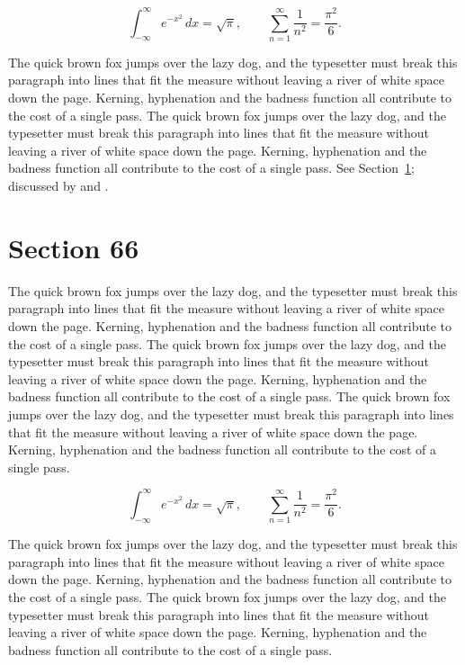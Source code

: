 \documentclass{article}
\begin{document}
\begin{equation}\label{eq:65}
\int_{-\infty}^{\infty} e^{-x^{2}}\,dx = \sqrt{\pi}, \qquad
\sum_{n=1}^{\infty} \frac{1}{n^{2}} = \frac{\pi^{2}}{6}.
\end{equation}

The quick brown fox jumps over the lazy dog, and the typesetter must break this paragraph into lines that fit the measure without leaving a river of white space down the page. Kerning, hyphenation and the badness function all contribute to the cost of a single pass. The quick brown fox jumps over the lazy dog, and the typesetter must break this paragraph into lines that fit the measure without leaving a river of white space down the page. Kerning, hyphenation and the badness function all contribute to the cost of a single pass. 
See Section~\ref{sec:66}; discussed by \textcite{k1} and \textcite{l3}.
\section{Section 66}
\label{sec:66}
The quick brown fox jumps over the lazy dog, and the typesetter must break this paragraph into lines that fit the measure without leaving a river of white space down the page. Kerning, hyphenation and the badness function all contribute to the cost of a single pass. The quick brown fox jumps over the lazy dog, and the typesetter must break this paragraph into lines that fit the measure without leaving a river of white space down the page. Kerning, hyphenation and the badness function all contribute to the cost of a single pass. The quick brown fox jumps over the lazy dog, and the typesetter must break this paragraph into lines that fit the measure without leaving a river of white space down the page. Kerning, hyphenation and the badness function all contribute to the cost of a single pass. 

\begin{equation}\label{eq:66}
\int_{-\infty}^{\infty} e^{-x^{2}}\,dx = \sqrt{\pi}, \qquad
\sum_{n=1}^{\infty} \frac{1}{n^{2}} = \frac{\pi^{2}}{6}.
\end{equation}

The quick brown fox jumps over the lazy dog, and the typesetter must break this paragraph into lines that fit the measure without leaving a river of white space down the page. Kerning, hyphenation and the badness function all contribute to the cost of a single pass. The quick brown fox jumps over the lazy dog, and the typesetter must break this paragraph into lines that fit the measure without leaving a river of white space down the page. Kerning, hyphenation and the badness function all contribute to the cost of a single pass. 
\end{document}
